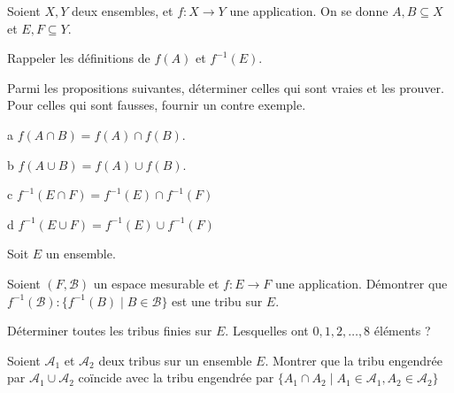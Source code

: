 \documentclass[french]{report}
\begin{document}
\begin{exo}
    Soient \(X,Y\) deux ensembles, et \(f\colon X\to Y\) une application.
    On se donne \(A,B\subseteq X\) et \(E,F\subseteq Y\).
    \begin{q}{1}
        Rappeler les définitions de \(f(A)\) et \(f^{-1}(E)\).
    \end{q}
    \begin{q}{2}
        Parmi les propositions suivantes, déterminer celles qui sont vraies et les
        prouver. Pour celles qui sont fausses, fournir un contre exemple.
        \begin{q}{a}
            \(f(A\cap B) = f(A)\cap f(B)\).
        \end{q}
        \begin{q}{b}
            \(f(A\cup B) = f(A)\cup f(B)\).
        \end{q}
        \begin{q}{c}
            \(f^{-1}(E\cap F)=f^{-1}(E)\cap f^{-1}(F)\)
        \end{q}
        \begin{q}{d}
            \(f^{-1}(E\cup F)=f^{-1}(E)\cup f^{-1}(F)\)
        \end{q}
    \end{q}
\end{exo}

\begin{exo}
    Soit \(E\) un ensemble.
    \begin{q}{1}
        Soient \(\left(F, \mathcal{B}\right)\) un espace mesurable et
        \(f\colon E\to F\) une application. Démontrer que \(f^{-1}(\mathcal{B})
        \colon\{f^{-1}(B)\mid B\in\mathcal{B}\}\) est une tribu sur \(E\).
    \end{q}
    \begin{q}{2}
        Déterminer toutes les tribus finies sur \(E\). Lesquelles ont
        \(0,1,2,\dots,8\) éléments ?
    \end{q}
\end{exo}

\begin{exo}
    Soient \(\mathcal{A}_1\) et \(\mathcal{A}_2\) deux tribus sur un ensemble \(E\).
    Montrer que la tribu engendrée par \(\mathcal{A}_1\cup\mathcal{A}_2\) coïncide
    avec la tribu engendrée par \(\{A_1\cap A_2\mid A_1\in\mathcal{A}_1, A_2\in\mathcal{A}_2\}\)
\end{exo}
\end{document}
